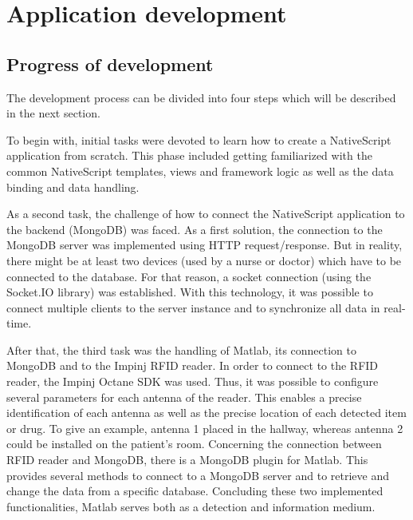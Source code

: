 \section{Application development} \label{app_development}

\subsection{Progress of development}

The development process can be divided into four steps which will be described in the next section. 

To begin with, initial tasks were devoted to learn how to create a NativeScript application from scratch. This phase included getting familiarized with the common NativeScript templates, views and framework logic as well as the data binding and data handling.

As a second task, the challenge of how to connect the NativeScript application to the backend (MongoDB) was faced. As a first solution, the connection to the MongoDB server was implemented using HTTP request/response. But in reality, there might be at least two devices (used by a nurse or doctor) which have to be connected to the database. For that reason, a socket connection (using the Socket.IO library) was established. With this technology, it was possible to connect multiple clients to the server instance and to synchronize all data in real-time.

After that, the third task was the handling of Matlab, its connection to MongoDB and to the Impinj RFID reader. In order to connect to the RFID reader, the Impinj Octane SDK was used. Thus, it was possible to configure several parameters for each antenna of the reader. This enables a precise identification of each antenna as well as the precise location of each detected item or drug. To give an example, antenna 1 placed in the hallway, whereas antenna 2 could be installed on the patient's room. 
Concerning the connection between RFID reader and MongoDB, there is a MongoDB plugin for Matlab. This provides several methods to connect to a MongoDB server and to retrieve and change the data from a specific database. Concluding these two implemented functionalities, Matlab serves both as a detection and information medium.


